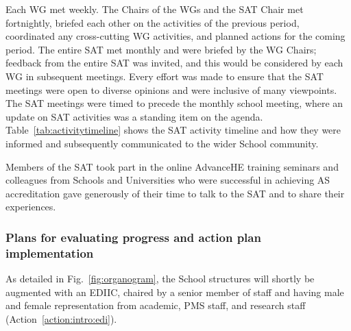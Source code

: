 Each WG met weekly. The Chairs of the WGs and the SAT Chair met fortnightly, briefed each other on the activities of the previous period, coordinated any cross-cutting WG activities, and planned actions for the coming period. 
The entire SAT met monthly and were briefed by the WG Chairs; feedback from the entire SAT was invited, and this would be considered by each WG in subsequent meetings. Every effort was made to ensure that the SAT meetings were open to diverse opinions and were inclusive of many viewpoints. 
The SAT meetings were timed to precede the monthly school meeting, where an update on SAT activities was a standing item on the agenda.
Table~\ref{tab:activitytimeline} shows the SAT activity timeline and how they were informed and subsequently communicated to the wider School community.

Members of the SAT took part in the online AdvanceHE training seminars and colleagues from Schools and Universities who were successful in achieving AS accreditation gave generously of their time to talk to the SAT and to share their experiences. 







\subsubsection{Plans for evaluating progress and action plan implementation}

As detailed in Fig.~\ref{fig:organogram}, the School structures will shortly be augmented with an \ac{EDIIC}, chaired by a senior member of staff and having male and female representation from academic, \ac{PMS} staff, and research staff (Action~\ref{action:intro:edi}). 

